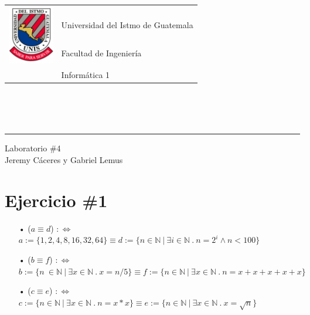 \documentclass[11pt,letterpaper]{article}
\begin{document}
\begin{tabular}{l l}
\multirow{3}{*}{\includegraphics[width=2cm]{../../recursos/logo}} 
 & \\
 & \LARGE Universidad del Istmo de Guatemala \\
 & \LARGE Facultad de Ingeniería \\
 & \LARGE Informática 1 \\
\end{tabular}
\\\\\\

\begin{center}
	\hrule
	\vspace{0.5cm}
	\huge{Laboratorio \#4} \\
	\vspace{0.1cm}
    \Large{Jeremy Cáceres y Gabriel Lemus}\\
    \vspace{0.05cm}
    \hrulefill
\end{center}
\vspace{0.05cm}

\section{Ejercicio \#1}
\begin{itemize}
\item[•] ($a \equiv d$) $:\Leftrightarrow$ $a:=\{1,2,4,8,16,32,64\} \equiv d:=\{n\in\mathbb{N}\ |\ \exists i\in\mathbb{N}\ .\ n=2^i\wedge n<100 \}$

\item[•] ($b \equiv f$) $:\Leftrightarrow$ $b:=\{n\ \in \mathbb{N}\ |\ \exists x \in \mathbb{N}\ .\ x=n/5 \} \equiv f:=\{ n\in\mathbb{N}\ |\ \exists x\in \mathbb{N}\ .\ n=x+x+x+x+x \}$

\item[•] ($c \equiv e$) $:\Leftrightarrow$ $c:=\{n\in \mathbb{N}\ |\ \exists x\in\mathbb{N}\ .\ n=x*x \} \equiv e:=\{ n\in\mathbb{N}\ |\ \exists x\in \mathbb{N}\ .\ x=\sqrt{n} \}$
\end{itemize}
\end{document}
